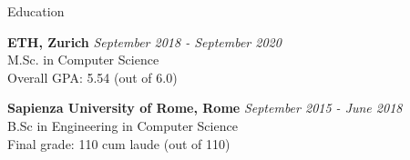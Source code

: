 \documentclass{resume}
\begin{document}

\begin{rSection}{Education}

{\bf ETH, Zurich} \hfill {\em September 2018 - September 2020} \\ 
M.Sc. in Computer Science\\
Overall GPA: 5.54 (out of 6.0)

{\bf Sapienza University of Rome, Rome} \hfill {\em September 2015 - June 2018} \\ 
B.Sc in Engineering in Computer Science\\
Final grade: 110 cum laude (out of 110)

\end{rSection}

\end{document}
